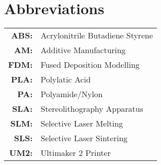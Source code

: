 \renewcommand{\baselinestretch}{1}
\chapter{Abbreviations}

\begin{tabular}{rl}
   \vspace{0.1em} \textbf{ABS:} & Acrylonitrile Butadiene Styrene\\
  \vspace{0.1em} \textbf{AM:} & Additive Manufacturing\\
  \vspace{0.1em} \textbf{FDM:} & Fused Deposition Modelling \\
  \vspace{0.1em} \textbf{PLA:} & Polylatic Acid\\
  \vspace{0.1em} \textbf{PA:} & Polyamide/Nylon\\
  \vspace{0.1em} \textbf{SLA:} & Stereolithography Apparatus\\
  \vspace{0.1em} \textbf{SLM:} & Selective Laser Melting\\
  \vspace{0.1em} \textbf{SLS:} & Selective Laser Sintering\\
  \vspace{0.1em} \textbf{UM2:} & Ultimaker 2 Printer\\
  
 
  
\end{tabular}


